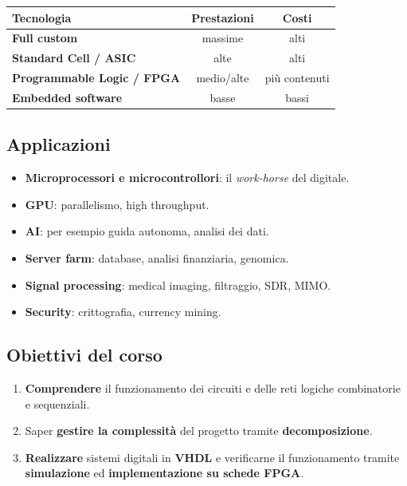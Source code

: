 \documentclass[12pt, a4paper]{article}
\begin{document}
\begin{center}
\renewcommand{\arraystretch}{1.35}
\begin{tabular}{|l|c|c|}
\hline
\colorbox{gray!25}{\color{black}\textbf{Tecnologia}} & \colorbox{gray!25}{\color{black}\textbf{Prestazioni}} & \colorbox{gray!25}{\color{black}\textbf{Costi}} \\ \hline
\textbf{Full custom} & massime & alti \\ \hline
\textbf{Standard Cell / ASIC} & alte & alti \\ \hline
\textbf{Programmable Logic / FPGA} & medio/alte & più contenuti \\ \hline
\textbf{Embedded software} & basse & bassi \\ \hline
\end{tabular}
\end{center}

\subsection{Applicazioni}

\begin{itemize}
    \item \textbf{Microprocessori e microcontrollori}: il \emph{work-horse} del digitale.
    \item \textbf{GPU}: parallelismo, high throughput.
    \item \textbf{AI}: per esempio guida autonoma, analisi dei dati.
    \item \textbf{Server farm}: database, analisi finanziaria, genomica.
    \item \textbf{Signal processing}: medical imaging, filtraggio, SDR, MIMO.
    \item \textbf{Security}: crittografia, currency mining.
\end{itemize}

\subsection{Obiettivi del corso}

\begin{enumerate}
    \item \textbf{Comprendere} il funzionamento dei circuiti e delle reti logiche combinatorie e sequenziali.
    \item Saper \textbf{gestire la complessità} del progetto tramite \textbf{decomposizione}.
    \item \textbf{Realizzare} sistemi digitali in \textbf{VHDL} e verificarne il funzionamento tramite \textbf{simulazione} ed \textbf{implementazione su schede FPGA}.
\end{enumerate}
\end{document}
